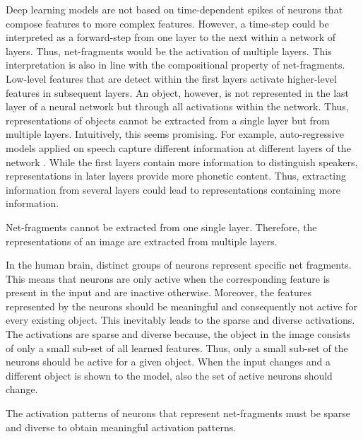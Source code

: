 Deep learning models are not based on time-dependent spikes of neurons that compose features to more complex features.
However, a time-step could be interpreted as a forward-step from one layer to the next within a network of layers.
Thus, net-fragments would be the activation of multiple layers.
This interpretation is also in line with the compositional property of net-fragments.
Low-level features that are detect within the first layers activate higher-level features in subsequent layers.
An object, however, is not represented in the last layer of a neural network but through all activations within the network.
Thus, representations of objects cannot be extracted from a single layer but from multiple layers.
Intuitively, this seems promising.
For example, auto-regressive models applied on speech capture different information at different layers of the network .
While the first layers contain more information to distinguish speakers, representations in later layers provide more phonetic content.
Thus, extracting information from several layers could lead to representations containing more information.

\begin{implementation}
	Net-fragments cannot be extracted from one single layer. Therefore, the representations of an image are extracted from multiple layers.
\end{implementation}

In the human brain, distinct groups of neurons represent specific net fragments.
This means that neurons are only active when the corresponding feature is present in the input and are inactive otherwise.
Moreover, the features represented by the neurons should be meaningful and consequently not active for every existing object.
This inevitably leads to the sparse and diverse activations.
The activations are sparse and diverse because, the object in the image consists of only a small sub-set of all learned features. Thus, only a small sub-set of the neurons should be active for a given object.
When the input changes and a different object is shown to the model, also the set of active neurons should change.

\begin{claim}
	The activation patterns of neurons that represent net-fragments must be sparse and diverse to obtain meaningful activation patterns.
\end{claim}

